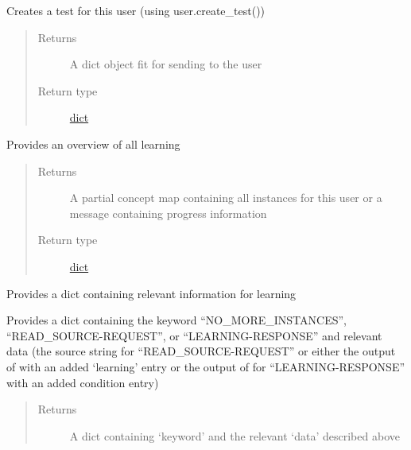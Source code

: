 \documentclass[letterpaper,10pt,english]{sphinxmanual}
\begin{document}
\begin{fulllineitems}

\begin{fulllineitems}
\label{\detokenize{consumer:consumer.Consumer.create_test}}
Creates a test for this user (using user.create\_test())
\begin{quote}\begin{description}
\item[{Returns}] \leavevmode
A dict object fit for sending to the user

\item[{Return type}] \leavevmode
\href{https://docs.python.org/2/library/stdtypes.html\#dict}{dict}

\end{description}\end{quote}

\end{fulllineitems}


\begin{fulllineitems}
\label{\detokenize{consumer:consumer.Consumer.provide_learned_items}}
Provides an overview of all learning
\begin{quote}\begin{description}
\item[{Returns}] \leavevmode
A partial concept map containing all instances for this user or a message containing progress information

\item[{Return type}] \leavevmode
\href{https://docs.python.org/2/library/stdtypes.html\#dict}{dict}

\end{description}\end{quote}

\end{fulllineitems}


\begin{fulllineitems}
\label{\detokenize{consumer:consumer.Consumer.provide_learning}}
Provides a dict containing relevant information for learning

Provides a dict containing the keyword ``NO\_MORE\_INSTANCES'', ``READ\_SOURCE-REQUEST'', or ``LEARNING-RESPONSE'' and relevant data (the source string for ``READ\_SOURCE-REQUEST'' or either the output of  with an added `learning' entry or the output of  for ``LEARNING-RESPONSE'' with an added condition entry)
\begin{quote}\begin{description}
\item[{Returns}] \leavevmode
A dict containing `keyword' and the relevant `data' described above


\end{description}
\end{quote}
\end{fulllineitems}
\end{fulllineitems}
\end{document}
